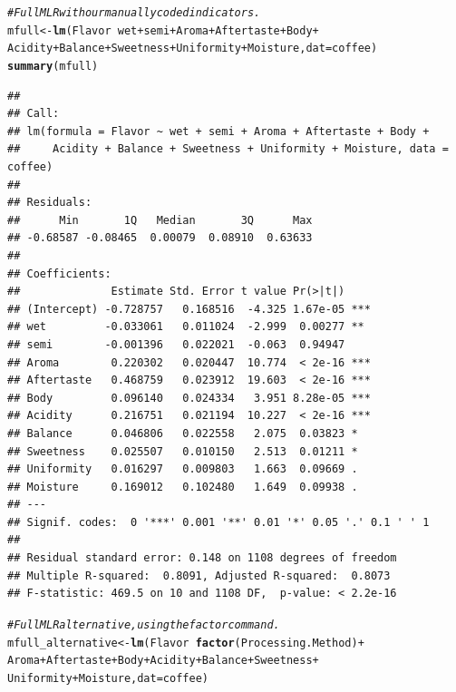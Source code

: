 \documentclass[oneside]{book}\usepackage[]{graphicx}\usepackage[dvipsnames,table,xcdraw]{xcolor}
\makeatletter
\newcommand{\hlcom}[1]{\textcolor[rgb]{0.678,0.584,0.686}{\textit{#1}}}%
\newcommand{\hlopt}[1]{\textcolor[rgb]{0,0,0}{#1}}%
\newcommand{\hlstd}[1]{\textcolor[rgb]{0.345,0.345,0.345}{#1}}%
\newcommand{\hlkwb}[1]{\textcolor[rgb]{0.69,0.353,0.396}{#1}}%
\newcommand{\hlkwc}[1]{\textcolor[rgb]{0.333,0.667,0.333}{#1}}%
\newcommand{\hlkwd}[1]{\textcolor[rgb]{0.737,0.353,0.396}{\textbf{#1}}}%
\newenvironment{kframe}{%
 \def\at@end@of@kframe{}%
 \ifinner\ifhmode%
  \def\at@end@of@kframe{\end{minipage}}%
  \begin{minipage}{\columnwidth}%
 \fi\fi%
 \def\FrameCommand##1{\hskip\@totalleftmargin \hskip-\fboxsep
 \colorbox{shadecolor}{##1}\hskip-\fboxsep
     \hskip-\linewidth \hskip-\@totalleftmargin \hskip\columnwidth}%
 \MakeFramed {\advance\hsize-\width
   \@totalleftmargin\z@ \linewidth\hsize
   \@setminipage}}%
 {\par\unskip\endMakeFramed%
 \at@end@of@kframe}
\newenvironment{knitrout}{}{} %
\makeatother
\begin{document}
\begin{knitrout}
\color{fgcolor}\begin{kframe}
\begin{alltt}
\hlcom{# Full MLR with our manually coded indicators.}
\hlstd{mfull} \hlkwb{<-} \hlkwd{lm}\hlstd{(Flavor} \hlopt{~} \hlstd{wet} \hlopt{+} \hlstd{semi} \hlopt{+} \hlstd{Aroma} \hlopt{+} \hlstd{Aftertaste} \hlopt{+} \hlstd{Body} \hlopt{+}
  \hlstd{Acidity} \hlopt{+} \hlstd{Balance} \hlopt{+} \hlstd{Sweetness} \hlopt{+} \hlstd{Uniformity} \hlopt{+} \hlstd{Moisture,} \hlkwc{dat} \hlstd{= coffee)}
\hlkwd{summary}\hlstd{(mfull)}
\end{alltt}
\begin{verbatim}
## 
## Call:
## lm(formula = Flavor ~ wet + semi + Aroma + Aftertaste + Body + 
##     Acidity + Balance + Sweetness + Uniformity + Moisture, data = coffee)
## 
## Residuals:
##      Min       1Q   Median       3Q      Max 
## -0.68587 -0.08465  0.00079  0.08910  0.63633 
## 
## Coefficients:
##              Estimate Std. Error t value Pr(>|t|)    
## (Intercept) -0.728757   0.168516  -4.325 1.67e-05 ***
## wet         -0.033061   0.011024  -2.999  0.00277 ** 
## semi        -0.001396   0.022021  -0.063  0.94947    
## Aroma        0.220302   0.020447  10.774  < 2e-16 ***
## Aftertaste   0.468759   0.023912  19.603  < 2e-16 ***
## Body         0.096140   0.024334   3.951 8.28e-05 ***
## Acidity      0.216751   0.021194  10.227  < 2e-16 ***
## Balance      0.046806   0.022558   2.075  0.03823 *  
## Sweetness    0.025507   0.010150   2.513  0.01211 *  
## Uniformity   0.016297   0.009803   1.663  0.09669 .  
## Moisture     0.169012   0.102480   1.649  0.09938 .  
## ---
## Signif. codes:  0 '***' 0.001 '**' 0.01 '*' 0.05 '.' 0.1 ' ' 1
## 
## Residual standard error: 0.148 on 1108 degrees of freedom
## Multiple R-squared:  0.8091,	Adjusted R-squared:  0.8073 
## F-statistic: 469.5 on 10 and 1108 DF,  p-value: < 2.2e-16
\end{verbatim}
\begin{alltt}
\hlcom{# Full MLR alternative, using the factor command.}
\hlstd{mfull_alternative} \hlkwb{<-} \hlkwd{lm}\hlstd{(Flavor} \hlopt{~} \hlkwd{factor}\hlstd{(Processing.Method)} \hlopt{+}
  \hlstd{Aroma} \hlopt{+} \hlstd{Aftertaste} \hlopt{+} \hlstd{Body} \hlopt{+} \hlstd{Acidity} \hlopt{+} \hlstd{Balance} \hlopt{+} \hlstd{Sweetness} \hlopt{+}
  \hlstd{Uniformity} \hlopt{+} \hlstd{Moisture,} \hlkwc{dat} \hlstd{= coffee)}
\end{alltt}
\end{kframe}
\end{knitrout}
\end{document}
